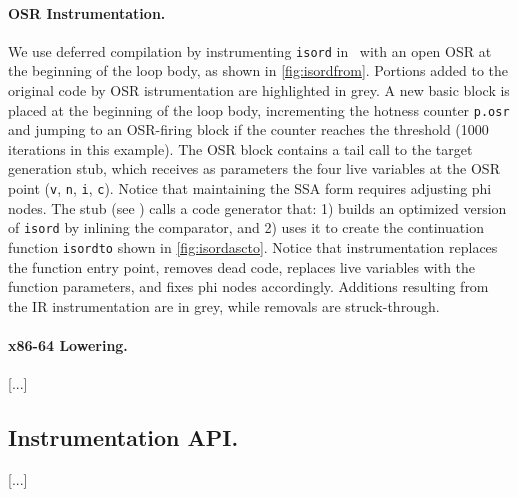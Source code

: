 \paragraph{OSR Instrumentation.}
We use deferred compilation by instrumenting {\tt isord} in \tinyvm\ with an open OSR at the beginning of the loop body, as shown in \myfigure\ref{fig:isordfrom}. Portions added to the original code by OSR istrumentation are highlighted in grey.
A new basic block is placed at the beginning of the loop body, incrementing the hotness counter {\tt p.osr} and jumping to an OSR-firing block if the counter reaches the threshold (1000 iterations in this example). The OSR block contains a tail call to the target generation stub, which receives as parameters the four live variables at the OSR point ({\tt v}, {\tt n}, {\tt i}, {\tt c}). Notice that maintaining the SSA form requires adjusting phi nodes. The stub (see \myfigure[...]) calls a code generator that: 1) builds an optimized version of {\tt isord} by inlining the comparator, and 2) uses it to create the continuation function {\tt isordto} shown in \myfigure\ref{fig:isordascto}. Notice that instrumentation replaces the function entry point, removes dead code, replaces live variables with the function parameters, and fixes phi nodes accordingly. Additions resulting from the IR instrumentation are in grey, while removals are struck-through.

\paragraph{x86-64 Lowering.}
[...]

\subsection{Instrumentation API.}
[...]





